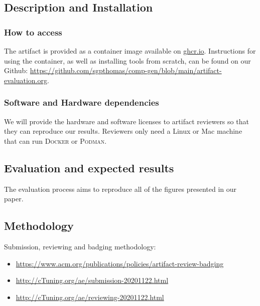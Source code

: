 \documentclass{sigplanconf}
\begin{document}
\subsection{Description and Installation}

\subsubsection{How to access}

The artifact is provided as a container image available on \url{ghcr.io}. Instructions for using the container, as well as installing tools from scratch, can be found on our Github: \url{https://github.com/sgpthomas/comp-gen/blob/main/artifact-evaluation.org}.

\subsubsection{Software and Hardware dependencies}

We will provide the hardware and software licenses to artifact reviewers so that they can reproduce our results. Reviewers only need a Linux or Mac machine that can run \textsc{Docker} or \textsc{Podman}.


\subsection{Evaluation and expected results}

The evaluation process aims to reproduce all of the figures presented in our paper.


\subsection{Methodology}

Submission, reviewing and badging methodology:

\begin{itemize}
  \item \url{https://www.acm.org/publications/policies/artifact-review-badging}
  \item \url{http://cTuning.org/ae/submission-20201122.html}
  \item \url{http://cTuning.org/ae/reviewing-20201122.html}
\end{itemize}

\end{document}
